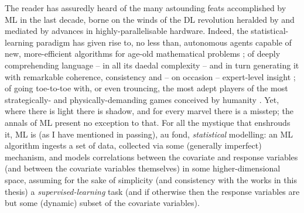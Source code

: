 The reader has assuredly heard of the many astounding feats accomplished by \ac{ML} in the last
decade, borne on the winds of the \ac{DL} revolution heralded by \citet{krizhevsky2012imagenet} and
mediated by advances in highly-parallelisable hardware.
%
Indeed, the statistical-learning paradigm has given rise to, no less than, autonomous agents
capable of new, more-efficient algorithms for age-old mathematical problems
\citep{fawzi2022discovering}; of deeply comprehending language -- in all its daedal complexity --
and in turn generating it with remarkable coherence, consistency and -- on occasion -- expert-level
insight \citep{brown2020language}; of going toe-to-toe with, or even trouncing, the most adept
players of the most strategically- and physically-demanding games conceived by humanity
\citep{silver2017mastering,berner2019dota,vinyals2019grandmaster,meta2022human}.
%
Yet, where there is light there is shadow, and for every marvel there is a misstep; the annals of
\ac{ML} present no exception to that.
%
For all the mystique that enshrouds it, \ac{ML} is (as I have mentioned in passing), au fond,
\emph{statistical} modelling: an \ac{ML} algorithm ingests a set of data, collected via some (generally
imperfect) mechanism, and models correlations between the covariate and response variables (and
between the covariate variables themselves) in some higher-dimensional space, assuming for the sake
of simplicity (and consistency with the works in this thesis) a \emph{supervised-learning} task
(and if otherwise then the response variables are but some (dynamic) subset of the covariate
variables).
%

